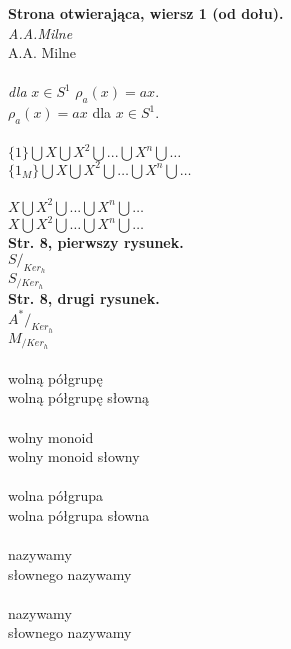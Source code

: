 \documentclass[a4paper,11pt]{article}
\begin{document}
\vspace{\spaceTwo}


\noindent
\textbf{Strona otwierająca, wiersz 1 (od dołu).} \\
\Jest  \textit{A.A.Milne} \\
\Powin A.A. Milne \\
 \\
\Jest  \textit{dla} $x \in S^{ 1 }$ $\rho_{ a }( x )= a x$. \\
\Powin $\rho_{ a }( x ) = a x$ dla $x \in S^{ 1 }$. \\
 \\
\Jest  $\{ 1 \} \bigcup X \bigcup X^{ 2 } \bigcup ... \bigcup X^{ n } \bigcup \ldots$ \\
\Powin $\{ 1_{ M } \} \bigcup X \bigcup X^{ 2 } \bigcup \ldots \bigcup X^{ n } \bigcup \ldots$ \\
 \\
\Jest  $X \bigcup X^{ 2 } \bigcup ... \bigcup X^{ n } \bigcup \ldots$ \\
\Powin $X \bigcup X^{ 2 } \bigcup \ldots \bigcup X^{ n } \bigcup \ldots$ \\
\textbf{Str. 8, pierwszy rysunek.} \\
\Jest  $S /_{ Ker_{ h } }$ \\
\Powin $S_{ / Ker_{ h } }$ \\
\textbf{Str. 8, drugi rysunek.} \\
\Jest  $A^{ * } /_{ Ker_{ h } }$ \\
\Powin $M_{ / Ker_{ h } }$ \\
 \\
\Jest  wolną półgrupę \\
\Powin wolną półgrupę słowną \\
 \\
\Jest  wolny monoid \\
\Powin wolny monoid słowny \\
 \\
\Jest  wolna półgrupa \\
\Powin wolna półgrupa słowna \\
 \\
\Jest  nazywamy \\
\Powin słownego nazywamy \\
 \\
\Jest  nazywamy \\
\Powin słownego nazywamy \\
 \\
\end{document}
